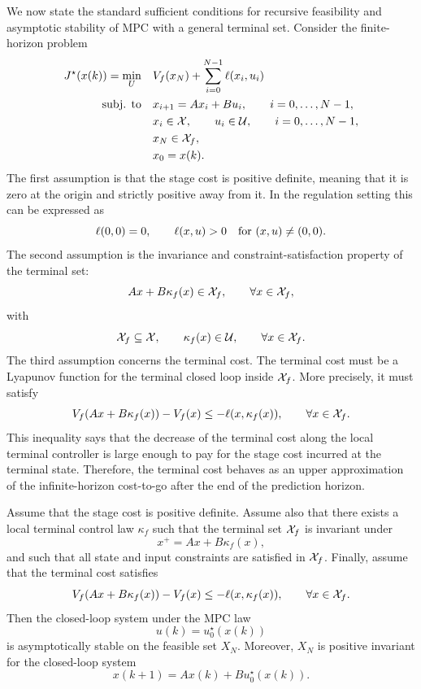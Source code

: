 We now state the standard sufficient conditions for recursive feasibility and asymptotic stability
of MPC with a general terminal set. Consider the finite-horizon problem
\[
\begin{aligned}
    J^\star(x(k))
    =
    \min_U \quad
    & V_f(x_N)
    +
    \sum_{i=0}^{N-1}\ell(x_i,u_i)\\
    \text{subj. to}\quad
    & x_{i+1}=Ax_i+Bu_i,
    \qquad i=0,\ldots,N-1,\\
    & x_i\in\mathcal{X},\qquad u_i\in\mathcal{U},
    \qquad i=0,\ldots,N-1,\\
    & x_N\in\mathcal{X}_f,\\
    & x_0=x(k).
\end{aligned}
\]
The first assumption is that the stage cost is positive definite, meaning that it is zero at the
origin and strictly positive away from it. In the regulation setting this can be expressed as
\[
    \ell(0,0)=0,
    \qquad
    \ell(x,u)>0
    \quad\text{for } (x,u)\neq(0,0).
\]
The second assumption is the invariance and constraint-satisfaction property of the terminal
set:
\[
    Ax+B\kappa_f(x)\in\mathcal{X}_f,
    \qquad \forall x\in\mathcal{X}_f,
\]
with
\[
    \mathcal{X}_f\subseteq\mathcal{X},
    \qquad
    \kappa_f(x)\in\mathcal{U},
    \qquad \forall x\in\mathcal{X}_f.
\]
The third assumption concerns the terminal cost. The terminal cost must be a Lyapunov
function for the terminal closed loop inside \(\mathcal{X}_f\). More precisely, it must satisfy
\[
    V_f(Ax+B\kappa_f(x))-V_f(x)
    \leq
    -\ell(x,\kappa_f(x)),
    \qquad \forall x\in\mathcal{X}_f.
\]
This inequality says that the decrease of the terminal cost along the local terminal controller
is large enough to pay for the stage cost incurred at the terminal state. Therefore, the terminal
cost behaves as an upper approximation of the infinite-horizon cost-to-go after the end of the
prediction horizon.

\begin{theorembox}
Assume that the stage cost is positive definite. Assume also that there exists a local terminal
control law \(\kappa_f\) such that the terminal set \(\mathcal{X}_f\) is invariant under
\[
    x^+ = Ax+B\kappa_f(x),
\]
and such that all state and input constraints are satisfied in \(\mathcal{X}_f\). Finally, assume that the
terminal cost satisfies
\[
    V_f(Ax+B\kappa_f(x))-V_f(x)
    \leq
    -\ell(x,\kappa_f(x)),
    \qquad \forall x\in\mathcal{X}_f.
\]
Then the closed-loop system under the MPC law
\[
    u(k)=u_0^\star(x(k))
\]
is asymptotically stable on the feasible set \(X_N\). Moreover, \(X_N\) is positive invariant for
the closed-loop system
\[
    x(k+1)=Ax(k)+Bu_0^\star(x(k)).
\]
\end{theorembox}

